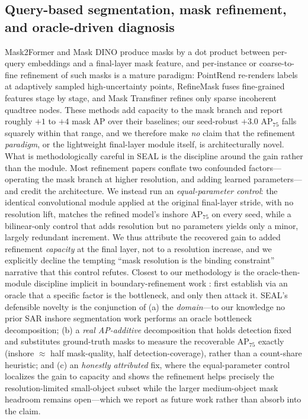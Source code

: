 \subsection{Query-based segmentation, mask refinement, and oracle-driven diagnosis}
Mask2Former \cite{cheng2022mask2former} and Mask DINO \cite{li2023maskdino} produce masks by a dot product between per-query embeddings and a final-layer mask feature, and per-instance or coarse-to-fine refinement of such masks is a mature paradigm: PointRend \cite{kirillov2020pointrend} re-renders labels at adaptively sampled high-uncertainty points, RefineMask \cite{zhang2021refinemask} fuses fine-grained features stage by stage, and Mask Transfiner \cite{ke2022masktransfiner} refines only sparse incoherent quadtree nodes. These methods add capacity to the mask branch and report roughly $+1$ to $+4$ mask AP over their baselines; our seed-robust $+3.0$ AP$_{75}$ falls squarely within that range, and we therefore make \emph{no} claim that the refinement \emph{paradigm}, or the lightweight final-layer module itself, is architecturally novel. What is methodologically careful in SEAL is the discipline around the gain rather than the module. Most refinement papers conflate two confounded factors---operating the mask branch at higher resolution, and adding learned parameters---and credit the architecture. We instead run an \emph{equal-parameter control}: the identical convolutional module applied at the original final-layer stride, with no resolution lift, matches the refined model's inshore AP$_{75}$ on every seed, while a bilinear-only control that adds resolution but no parameters yields only a minor, largely redundant increment. We thus attribute the recovered gain to added refinement \emph{capacity} at the final layer, not to a resolution increase, and we explicitly decline the tempting ``mask resolution is the binding constraint'' narrative that this control refutes. Closest to our methodology is the oracle-then-module discipline implicit in boundary-refinement work \cite{cheng2021boundary,tang2021bpr}: first establish via an oracle that a specific factor is the bottleneck, and only then attack it. SEAL's defensible novelty is the conjunction of (a) the \emph{domain}---to our knowledge no prior SAR inshore segmentation work performs an oracle bottleneck decomposition; (b) a \emph{real AP-additive} decomposition that holds detection fixed and substitutes ground-truth masks to measure the recoverable AP$_{75}$ exactly (inshore $\approx$ half mask-quality, half detection-coverage), rather than a count-share heuristic; and (c) an \emph{honestly attributed} fix, where the equal-parameter control localizes the gain to capacity and shows the refinement helps precisely the resolution-limited small-object subset while the larger medium-object mask headroom remains open---which we report as future work rather than absorb into the claim.

